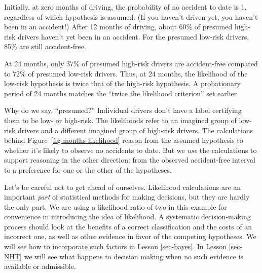 \documentclass[
  letterpaper,
  DIV=11,
  numbers=noendperiod,
  oneside]{scrartcl}
\begin{document}
Initially, at zero months of driving, the probability of no accident to
date is 1, regardless of which hypothesis is assumed. (If you haven't
driven yet, you haven't been in an accident!) After 12 months of
driving, about 60\% of presumed high-risk drivers haven't yet been in an
accident. For the presumed low-risk drivers, 85\% are still
accident-free.

At 24 months, only 37\% of presumed high-risk drivers are accident-free
compared to 72\% of presumed low-risk drivers. Thus, at 24 months, the
likelihood of the low-risk hypothesis is twice that of the high-risk
hypothesis. A probationary period of 24 months matches the ``twice the
likelihood criterion'' set earlier.

Why do we say, ``presumed?'' Individual drivers don't have a label
certifying them to be low- or high-risk. The likelihoods refer to an
imagined group of low-risk drivers and a different imagined group of
high-risk drivers. The calculations behind
Figure~\ref{fig-months-likelihood} reason from the assumed hypothesis to
whether it's likely to observe no accidents to date. But we \emph{use}
the calculations to support reasoning in the other direction: from the
observed accident-free interval to a preference for one or the other of
the hypotheses.

Let's be careful not to get ahead of ourselves. Likelihood calculations
are an important \emph{part} of statistical methods for making
decisions, but they are hardly the only part. We are using a likelihood
ratio of two in this example for convenience in introducing the idea of
likelihood. {} A systematic decision-making process
should look at the benefits of a correct classification and the costs of
an incorrect one, as well as other evidence in favor of the competing
hypotheses. We will see how to incorporate such factors in Lesson
\ref{sec-bayes}. In Lesson \ref{sec-NHT} we will see what happens to
decision making when no such evidence is available or admissible.
\end{document}
